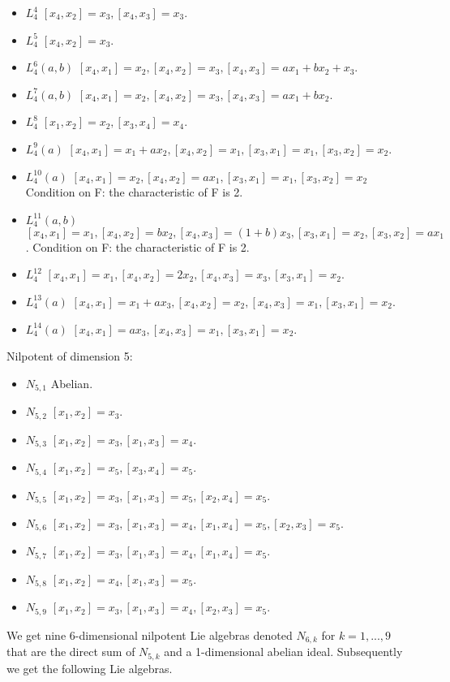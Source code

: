 \documentclass[a4paper,11pt]{report}
\begin{document}
{{\begin{itemize}
\item  $L_4^4$ $[x_4,x_2]=x_3, [x_4,x_3]= x_3$.
\item  $L_4^5$ $[x_4,x_2]=x_3$.
\item  $L_4^6(a,b)$ $[x_4,x_1] = x_2, [x_4,x_2]=x_3, [x_4,x_3] = ax_1+bx_2+x_3$.
\item  $L_4^7(a,b)$ $[x_4,x_1] = x_2, [x_4,x_2]=x_3, [x_4,x_3] = ax_1+bx_2.$ 
\item  $L_4^8$ $[x_1,x_2]=x_2, [x_3,x_4]=x_4$.
\item  $L_4^9(a)$ $[x_4,x_1] = x_1+ax_2, [x_4,x_2]=x_1, [x_3,x_1]=x_1, [x_3,x_2]=x_2$.
\item  $L_4^{10}(a)$ $[x_4,x_1] = x_2, [x_4,x_2]=ax_1, [x_3,x_1]=x_1, [x_3,x_2]=x_2$ Condition on F: the characteristic of F is 2.
\item  $L_4^{11}(a,b)$ $[x_4,x_1] = x_1, [x_4,x_2] = bx_2, [x_4,x_3]=(1+b)x_3, [x_3,x_1]=x_2,
[x_3,x_2]=ax_1$. Condition on F: the characteristic of F is 2. 
\item  $L_4^{12}$ $ [x_4,x_1] = x_1, [x_4,x_2]=2x_2, [x_4,x_3] = x_3, [x_3,x_1]=x_2$.
\item  $L_4^{13}(a)$ $[x_4,x_1] = x_1+ax_3, [x_4,x_2]=x_2, [x_4,x_3] = x_1, [x_3,x_1]=x_2$.
\item  $L_4^{14}(a)$ $[x_4,x_1] = ax_3, [x_4,x_3]=x_1, [x_3,x_1]=x_2$.
\end{itemize}
 Nilpotent of dimension 5: 
\begin{itemize}
\item  $N_{5,1}$ Abelian. 
\item  $N_{5,2}$ $[x_1,x_2]=x_3$.
\item  $N_{5,3}$ $[x_1,x_2]=x_3, [x_1,x_3]=x_4$.
\item  $N_{5,4}$ $[x_1,x_2]=x_5, [x_3,x_4]=x_5$.
\item  $N_{5,5}$ $[x_1,x_2]=x_3, [x_1,x_3]=x_5, [x_2,x_4]=x_5$.
\item  $N_{5,6}$ $[x_1,x_2]=x_3, [x_1,x_3]=x_4, [x_1,x_4]=x_5, [x_2,x_3]=x_5$.
\item  $N_{5,7}$ $[x_1,x_2]=x_3, [x_1,x_3]=x_4, [x_1,x_4]=x_5$.
\item  $N_{5,8}$ $[x_1,x_2]=x_4, [x_1,x_3]=x_5$.
\item  $N_{5,9}$ $[x_1,x_2]=x_3, [x_1,x_3]=x_4, [x_2,x_3]=x_5$.
\end{itemize}
 We get nine 6-dimensional nilpotent Lie algebras denoted $N_{6,k}$ for $k=1,...,9$ that are the direct sum of $N_{5,k}$ and a 1-dimensional abelian ideal. Subsequently we get the following Lie
algebras. 
\begin{itemize}

\end{itemize}}}
\end{document}
